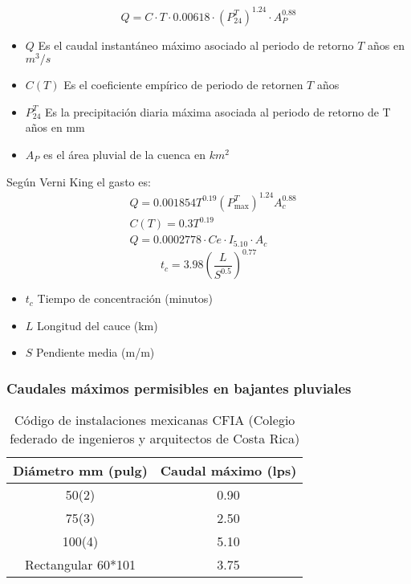 \begin{equation}
    Q = C \cdot T \cdot 0.00618 \cdot \left(P_{24}^T\right)^{1.24} \cdot A_P^{0.88}
\end{equation}
\begin{notation}
    \begin{itemize}
        \item $Q$ Es el caudal instantáneo máximo asociado al periodo de retorno $T$ años en $m^3/s$
        \item $C(T)$ Es el coeficiente empírico de periodo de retornen $T$ años
        \item $P_{24}^T$ Es la precipitación diaria máxima asociada al periodo de retorno de T años en mm
        \item $A_P$ es el área pluvial de la cuenca en $km^2$
    \end{itemize}
\end{notation}
Según Verni King el gasto es:
\begin{align*}
    &Q = 0.001854T^{0.19}\left(P_{\max }^{T}\right)^{1.24}A_c^{0.88}\\
    &C(T) = 0.3T^{0.19}\\
    &Q = 0.0002778 \cdot Ce \cdot I_{5.10} \cdot A_c
\end{align*}
\begin{equation}
    t_c = 3.98\left(\frac{L}{S^{0.5}}\right)^{0.77}
\end{equation}
\begin{notation}
    \begin{itemize}
        \item $t_c$ Tiempo de concentración (minutos)
        \item $L$ Longitud del cauce (km)
        \item $S$ Pendiente media (m/m)
    \end{itemize}
\end{notation}
\subsubsection{Caudales máximos permisibles en bajantes pluviales}
\begin{table}[h!]
    \centering
    \begin{tabular}{@{}cc@{}}
    \toprule
    Diámetro mm (pulg) & Caudal máximo (lps) \\ \midrule
    50(2)              & 0.90                \\
    75(3)              & 2.50                \\
    100(4)             & 5.10                \\
    Rectangular 60*101 & 3.75                \\ \bottomrule
    \end{tabular}
    \caption{Código de instalaciones mexicanas CFIA (Colegio federado de ingenieros y arquitectos de Costa Rica)}
    \label{tabtusa7}
\end{table}

